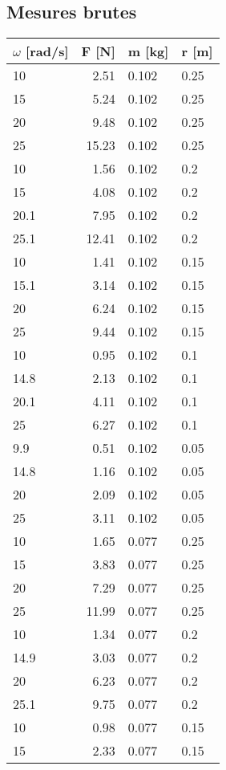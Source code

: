 \subsection{Mesures brutes}
    \begin{tabular}{|l|r|l|l|}
	\hline
	$\omega$ [rad/s] &F [N]	&m [kg]	&r [m]\\
	\hline
	10	&2.51	&0.102	&0.25 \\
	15	&5.24	&0.102	&0.25 \\
	20	&9.48	&0.102	&0.25 \\
	25	&15.23	&0.102	&0.25 \\
	10	&1.56	&0.102	&0.2  \\
	15	&4.08	&0.102	&0.2  \\
	20.1	&7.95	&0.102	&0.2  \\
	25.1	&12.41	&0.102	&0.2  \\
	10	&1.41	&0.102	&0.15 \\
	15.1	&3.14	&0.102	&0.15 \\
	20	&6.24	&0.102	&0.15 \\
	25	&9.44	&0.102	&0.15 \\
	10	&0.95	&0.102	&0.1  \\
	14.8	&2.13	&0.102	&0.1  \\
	20.1	&4.11	&0.102	&0.1  \\
	25	&6.27	&0.102	&0.1  \\
	9.9	&0.51	&0.102	&0.05 \\
	14.8	&1.16	&0.102	&0.05 \\
	20	&2.09	&0.102	&0.05 \\
	25	&3.11	&0.102	&0.05 \\
	10	&1.65	&0.077	&0.25 \\
	15	&3.83	&0.077	&0.25 \\
	20	&7.29	&0.077	&0.25 \\
	25	&11.99	&0.077	&0.25 \\
	10	&1.34	&0.077	&0.2  \\
	14.9	&3.03	&0.077	&0.2  \\
	20	&6.23	&0.077	&0.2  \\
	25.1	&9.75	&0.077	&0.2  \\
	10	&0.98	&0.077	&0.15 \\
	15	&2.33	&0.077	&0.15 \\
	\hline
    \end{tabular}
    \quad
